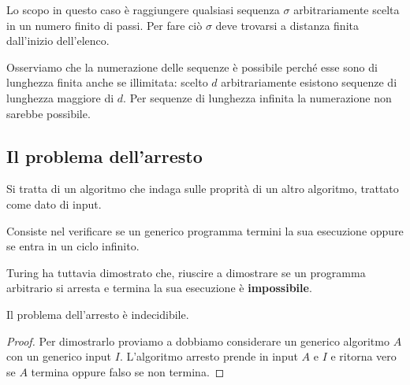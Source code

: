 Lo scopo in questo caso \`e raggiungere qualsiasi sequenza $\sigma$ arbitrariamente
scelta in un numero finito di passi. Per fare ci\`o $\sigma$ deve trovarsi a distanza
finita dall'inizio dell'elenco.

Osserviamo che la numerazione delle sequenze \`e possibile perch\'e esse sono di
lunghezza finita anche se illimitata: scelto $d$ arbitrariamente esistono sequenze
di lunghezza maggiore di $d$. Per sequenze di lunghezza infinita la numerazione non
sarebbe possibile.

\subsection{Il problema dell'arresto}
Si tratta di un algoritmo che indaga sulle proprit\`a di un altro algoritmo, trattato
come dato di input.

Consiste nel verificare se un generico programma termini la sua esecuzione oppure
se entra in un ciclo infinito.

Turing ha tuttavia dimostrato che, riuscire a dimostrare se un programma arbitrario
si arresta e termina la sua esecuzione \`e \textbf{impossibile}.

\begin{theorem}
	Il problema dell'arresto \`e indecidibile.
	\begin{proof}
		Per dimostrarlo proviamo a dobbiamo considerare un generico algoritmo $A$ con
		un generico input $I$. L'algoritmo arresto prende in input $A$ e $I$ e
		ritorna vero se $A$ termina oppure falso se non termina.
	\end{proof}
\end{theorem}
